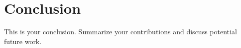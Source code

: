 \documentclass[12pt]{article}
\begin{document}
\section{Conclusion}
\label{chap:conclusion}

This is your conclusion. Summarize your contributions and discuss potential future work.



\vfill\pagebreak

\makeatletter
\def\section{\@startsection{section}{1}{\z@}
             {-3.5ex \@plus -1ex \@minus -.2ex}
             {5ex \@plus.2ex}
             {\bf\Large\noindent}}
\makeatother



\end{document}
